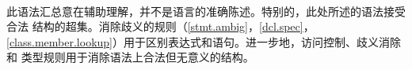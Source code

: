 \paragraph{} %
此语法汇总意在辅助理解，并不是语言的准确陈述。特别的，此处所述的语法接受合法
\cpp{}结构的超集。消除歧义的规则（\ref{stmt.ambig}，\ref{dcl.spec}，
\ref{class.member.lookup}）用于区别表达式和语句。进一步地，访问控制、歧义消除和
类型规则用于消除语法上合法但无意义的结构。
